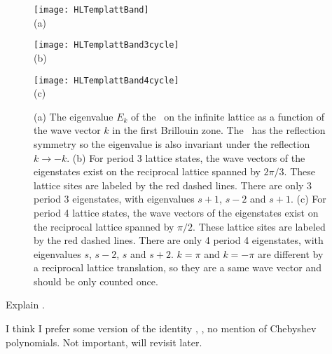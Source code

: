 \begin{figure}\begin{center}
            \begin{minipage}[c]{0.3\textwidth}\begin{center}
\texttt{[image: HLTemplattBand]}\\(a)
            \end{center}\end{minipage}
            \begin{minipage}[c]{0.3\textwidth}\begin{center}
\texttt{[image: HLTemplattBand3cycle]}\\(b)
            \end{center}\end{minipage}
            \begin{minipage}[c]{0.3\textwidth}\begin{center}
\texttt{[image: HLTemplattBand4cycle]}\\(c)
            \end{center}\end{minipage}
\end{center}
  \caption{\label{fig:LC21emplattBand}
(a) The eigenvalue $E_k$ of the \jacobianOrb\ on the infinite lattice as a function of the wave
vector $k$ in the first Brillouin zone. The \jacobianOrb\ has the reflection symmetry so the
eigenvalue is also invariant under the reflection $k\to -k$.
(b) For period 3 lattice states, the wave vectors of the eigenstates exist on the reciprocal lattice
spanned by $2\pi/3$. These lattice sites are labeled by the red dashed lines. There are only
3 period 3 eigenstates, with eigenvalues $s+1$, $s-2$ and $s+1$.
(c) For period 4 lattice states, the wave vectors of the eigenstates exist on the reciprocal lattice
spanned by $\pi/2$. These lattice sites are labeled by the red dashed lines. There are only
4 period 4 eigenstates, with eigenvalues $s$, $s-2$, $s$ and $s+2$.
$k=\pi$ and $k=-\pi$ are different by a reciprocal lattice translation, so they are a same
wave vector and should be only counted once.
          }
\end{figure}

Explain .

         {
I think I prefer some version of the identity ,
,
no mention of Chebyshev polynomials. Not important, will revisit later.
    }

